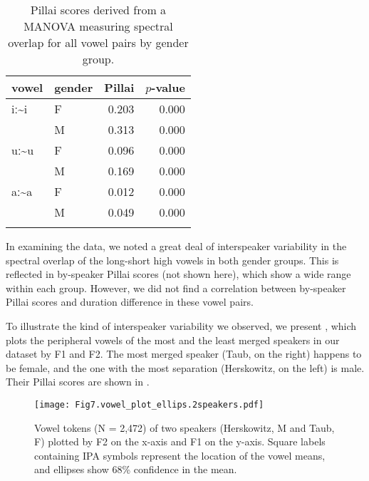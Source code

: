 \documentclass[output=paper,colorlinks,citecolor=brown]{langscibook}
\begin{document}
\begin{table}
\begin{tabularx}{.8\textwidth}{XXrr}
\lsptoprule
{ vowel} & { gender} & { Pillai} & { $p$-value}\\
\midrule
iː{\textasciitilde}i & F & 0.203 & 0.000\\
& M & 0.313 & 0.000\\
\midrule
uː{\textasciitilde}u & F & 0.096 & 0.000\\
& M & 0.169 & 0.000\\
\midrule
aː{\textasciitilde}a & F & 0.012 & 0.000\\
& M & 0.049 & 0.000\\
\lspbottomrule
\end{tabularx}
\caption{\label{tab:nove:5} Pillai scores derived from a MANOVA measuring spectral overlap for all vowel pairs by gender group.}
\end{table}

In examining the data, we noted a great deal of interspeaker variability in the spectral overlap of the long-short high vowels in both gender groups. This is reflected in by-speaker Pillai scores (not shown here), which show a wide range within each group. However, we did not find a correlation between by-speaker Pillai scores and duration difference in these vowel pairs.

To illustrate the kind of interspeaker variability we observed, we present , which plots the peripheral vowels of the most and the least merged speakers in our dataset by F1 and F2. The most merged speaker (Taub, on the right) happens to be female, and the one with the most separation (Herskowitz, on the left) is male. Their Pillai scores are shown in .


\begin{figure}[t]
\texttt{[image: Fig7.vowel\_plot\_ellips.2speakers.pdf]}
\caption{\label{fig:nove:7} Vowel tokens (N = 2,472) of two speakers (Herskowitz, M and Taub, F) plotted by F2 on the x-axis and F1 on the y-axis. Square labels containing IPA symbols represent the location of the vowel means, and ellipses show 68\% confidence in the mean.}
\end{figure}
\end{document}
